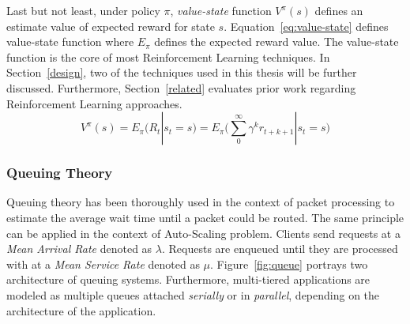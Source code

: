 Last but not least, under policy $\pi$, \emph{value-state} function $V^\pi(s)$ defines an estimate value of expected reward for state $s$. Equation~\ref{eq:value-state} defines value-state function where $E_\pi$ defines the expected reward value. The value-state function is the core of most Reinforcement Learning techniques. In Section~\ref{design}, two of the techniques used in this thesis will be further discussed. Furthermore, Section~\ref{related} evaluates prior work regarding Reinforcement Learning approaches.
\begin{equation}
V^\pi(s) = E_\pi(R_t|s_t=s)=E_\pi\bigg(\sum_{0}^{\infty}\gamma^k r_{t+k+1}|s_t=s\bigg)
\label{eq:value-state}
\end{equation}
\subsubsection{Queuing Theory}
Queuing theory has been thoroughly used in the context of packet processing to estimate the average wait time until a packet could be routed. The same principle can be applied in the context of Auto-Scaling problem. Clients send requests at a \emph{Mean Arrival Rate} denoted as $\lambda$. Requests are enqueued until they are processed with at a \emph{Mean Service Rate} denoted as $\mu$. Figure~\ref{fig:queue} portrays two architecture of queuing systems. Furthermore, multi-tiered applications are modeled as multiple queues attached \emph{serially} or in \emph{parallel}, depending on the architecture of the application.
